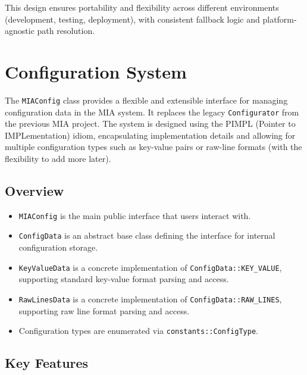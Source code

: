This design ensures portability and flexibility across different environments (development, testing, deployment), with consistent fallback logic and platform-agnostic path resolution.




















\section{Configuration System}
\label{section:configuration_system}

The \texttt{MIAConfig} class provides a flexible and extensible interface for managing configuration data in the MIA system. It replaces the legacy \texttt{Configurator} from the previous MIA project. The system is designed using the PIMPL (Pointer to IMPLementation) idiom, encapsulating implementation details and allowing for multiple configuration types such as key-value pairs or raw-line formats (with the flexibility to add more later).

\subsection{Overview}

\begin{itemize}\itemsep0em
	\item \texttt{MIAConfig} is the main public interface that users interact with.
	\item \texttt{ConfigData} is an abstract base class defining the interface for internal configuration storage.
	\item \texttt{KeyValueData} is a concrete implementation of \texttt{ConfigData::KEY\_VALUE}, supporting standard key-value format parsing and access.
	\item \texttt{RawLinesData} is a concrete implementation of \texttt{ConfigData::RAW\_LINES}, supporting raw line format parsing and access.
	\item Configuration types are enumerated via \texttt{constants::ConfigType}.
\end{itemize}

\subsection{Key Features}

